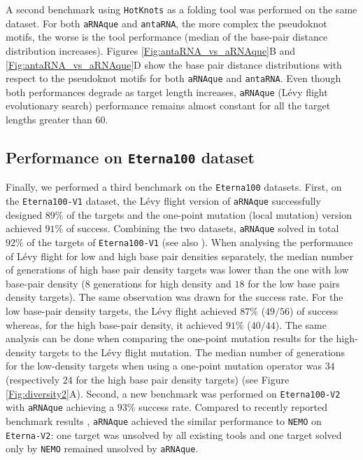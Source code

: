 A second benchmark using \texttt{HotKnots} as a folding tool was performed on the same dataset. For both \texttt{aRNAque} and \texttt{antaRNA}, the more complex the pseudoknot motifs, the worse is the tool performance (median of the base-pair distance distribution increases). Figures \ref{Fig:antaRNA_vs_aRNAque}B and \ref{Fig:antaRNA_vs_aRNAque}D show the base pair distance distributions with respect to the pseudoknot motifs for both \texttt{aRNAque} and \texttt{antaRNA}. Even though both performances degrade as target length increases, \texttt{aRNAque} (Lévy flight evolutionary search) performance remains almost constant for all the target lengths greater than $60$.


\subsection*{Performance on \texttt{Eterna100} dataset}

Finally, we performed a third benchmark on the \texttt{Eterna100} datasets. First, on the \texttt{Eterna100-V1} dataset, the Lévy flight version of \texttt{aRNAque} successfully designed $89\%$ of the targets and the one-point mutation (local mutation) version achieved $91\%$ of success. Combining the two datasets, \texttt{aRNAque} solved in total $92\%$ of the targets of \texttt{Eterna100-V1} (see also \cite{merleau2021simple}). When analysing the performance of Lévy flight for low and high base pair densities separately, the median number of generations of high base pair density targets was lower than the one with low base-pair density ($8$ generations for high density and $18$ for the low base pairs density targets). The same observation was drawn for the success rate. For the low base-pair density targets, the Lévy flight achieved $87\%$ ($49/56$) of success whereas, for the high base-pair density, it achieved $91\%$ ($40/44$). The same analysis can be done when comparing the one-point mutation results for the high-density targets to the Lévy flight mutation. The median number of generations for the low-density targets when using a one-point mutation operator was $34$ (respectively $24$ for the high base pair density targets) (see Figure \ref{Fig:diversity2}A). Second, a new benchmark was performed on \texttt{Eterna100-V2} with \texttt{aRNAque} achieving a $93\%$ success rate. Compared to recently reported benchmark results \cite{Eterna}, \texttt{aRNAque} achieved the similar performance to \texttt{NEMO} on \texttt{Eterna-V2}: one target was unsolved by all existing tools and one target solved only by \texttt{NEMO} remained unsolved by \texttt{aRNAque}. 



